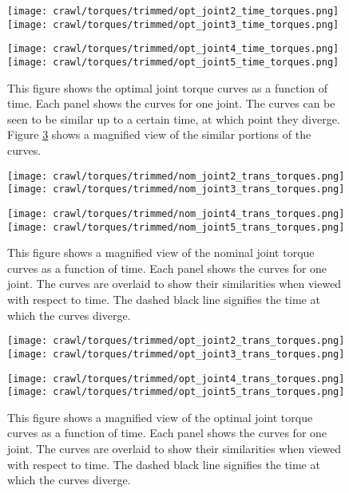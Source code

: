 \begin{figure}
  \centerline{
    \texttt{[image: crawl/torques/trimmed/opt\_joint2\_time\_torques.png]}
    \texttt{[image: crawl/torques/trimmed/opt\_joint3\_time\_torques.png]}
  }
  \centerline{
    \texttt{[image: crawl/torques/trimmed/opt\_joint4\_time\_torques.png]}
    \texttt{[image: crawl/torques/trimmed/opt\_joint5\_time\_torques.png]}
  }
  \caption{This figure shows the optimal joint torque curves as a function of time.
           Each panel shows the curves for one joint. The curves can be seen to be similar
           up to a certain time, at which point they diverge.
           Figure \ref{fig:vrep_opt_joint_transient_torques_by_joint1} shows a magnified
           view of the similar portions of the curves.}
  \label{fig:vrep_opt_joint_torques_by_joint_over_time1}
\end{figure}

\begin{figure}
  \centerline{
    \texttt{[image: crawl/torques/trimmed/nom\_joint2\_trans\_torques.png]}
    \texttt{[image: crawl/torques/trimmed/nom\_joint3\_trans\_torques.png]}
  }
  \centerline{
    \texttt{[image: crawl/torques/trimmed/nom\_joint4\_trans\_torques.png]}
    \texttt{[image: crawl/torques/trimmed/nom\_joint5\_trans\_torques.png]}
  }
  \caption{This figure shows a magnified view of the nominal joint torque curves as a function of time.
           Each panel shows the curves for one joint. The curves are overlaid to show their
           similarities when viewed with respect to time. The dashed black line signifies
           the time at which the curves diverge.}
  \label{fig:vrep_nom_joint_transient_torques_by_joint1}
\end{figure}

\begin{figure}
  \centerline{
    \texttt{[image: crawl/torques/trimmed/opt\_joint2\_trans\_torques.png]}
    \texttt{[image: crawl/torques/trimmed/opt\_joint3\_trans\_torques.png]}
  }
  \centerline{
    \texttt{[image: crawl/torques/trimmed/opt\_joint4\_trans\_torques.png]}
    \texttt{[image: crawl/torques/trimmed/opt\_joint5\_trans\_torques.png]}
  }
  \caption{This figure shows a magnified view of the optimal joint torque curves as a function of time.
           Each panel shows the curves for one joint. The curves are overlaid to show their
           similarities when viewed with respect to time. The dashed black line signifies
           the time at which the curves diverge.}
  \label{fig:vrep_opt_joint_transient_torques_by_joint1}
\end{figure}

